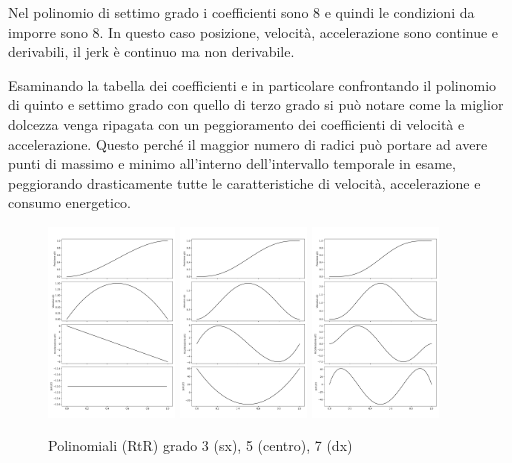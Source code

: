 Nel polinomio di settimo grado i coefficienti sono 8 e quindi le condizioni da imporre sono 8.
In questo caso posizione, velocità, accelerazione sono continue e derivabili, il jerk è continuo ma non derivabile.

Esaminando la tabella dei coefficienti e in particolare confrontando il polinomio di quinto e settimo grado con quello di terzo grado si può notare come la miglior dolcezza venga ripagata con un peggioramento dei coefficienti di velocità e accelerazione.
Questo perché il maggior numero di radici può portare ad avere punti di massimo e minimo all'interno dell'intervallo temporale in esame, peggiorando drasticamente tutte le caratteristiche di velocità, accelerazione e consumo energetico.

\begin{figure}[h]
    \centering
    \includegraphics[width=0.3\textwidth]{Immagini/polinom_terzo_grado.png}
    \includegraphics[width=0.3\textwidth]{Immagini/polinom_quinto_grado.png}
    \includegraphics[width=0.3\textwidth]{Immagini/polinom_settimo_grado.png}
    \caption{Polinomiali (RtR) grado 3 (sx), 5 (centro), 7 (dx)}
\end{figure}

